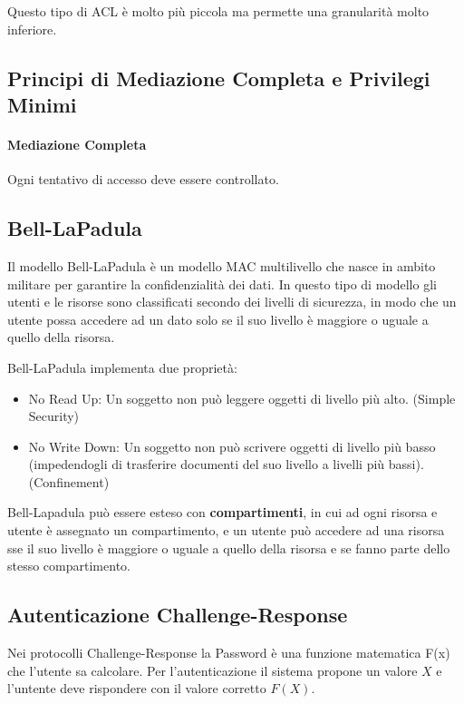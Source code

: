 \documentclass[12pt, a4paper, openany]{book}
\begin{document}
Questo tipo di ACL è molto più piccola ma permette una granularità molto inferiore.

\subsection{Principi di Mediazione Completa e Privilegi Minimi}
\paragraph{Mediazione Completa} Ogni tentativo di accesso deve essere controllato.


\subsection{Bell-LaPadula}
Il modello Bell-LaPadula è un modello MAC multilivello che nasce in ambito militare per garantire la confidenzialità dei dati.
In questo tipo di modello gli utenti e le risorse sono classificati secondo dei livelli di sicurezza, in modo che un utente possa accedere ad un dato solo se il suo livello è maggiore o uguale a quello della risorsa.

Bell-LaPadula implementa due proprietà:
\begin{itemize}
    \item No Read Up: Un soggetto non può leggere oggetti di livello più alto. (Simple Security)
    \item No Write Down: Un soggetto non può scrivere oggetti di livello più basso (impedendogli di trasferire documenti del suo livello a livelli più bassi). (Confinement)
\end{itemize}

Bell-Lapadula può essere esteso con \textbf{compartimenti}, in cui ad ogni risorsa e utente è assegnato un compartimento, e un utente può accedere ad una risorsa sse il suo livello è maggiore o uguale a quello della risorsa e se fanno parte dello stesso compartimento.

\subsection*{Autenticazione Challenge-Response}
Nei protocolli Challenge-Response la Password è una funzione matematica F(x) che l'utente sa calcolare. Per l'autenticazione il sistema propone un valore $X$ e l'untente deve rispondere con il valore corretto $F(X)$.
\end{document}
